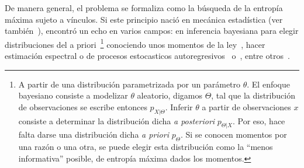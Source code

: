De manera general, el problema se  formaliza como la b\'usqueda de la entrop\'ia
m\'axima  sujeto  a  v\'inculos.    Si  este  principio  naci\'o  en  mec\'anica
estad\'istica  (ver  tambi\'en~\cite{Jay57,   Jay57:2,  Jay65,  Mer10,  Mer18}),
encontr\'o  un  echo en  varios  campos:  en  inferencia bayesiana  para  elegir
distribuciones   del   a  priori~\footnote{A   partir   de  una   distribuci\'on
  parametrizada por  un par\'ametro $\theta$.   El enfoque bayesiano  consiste a
  modelizar $\theta$  aleatorio, digamos $\Theta$, tal que  la distribuci\'on de
  observaciones se  escribe entonces $p_{X|\Theta}$.  Inferir  $\theta$ a partir
  de  observaciones $x$  consiste a  determinar la  distribuci\'on dicha  {\it a
    posteriori} $p_{\Theta|X}$.   Por eso,  hace falta darse  una distribuci\'on
  dicha {\it a priori} $p_\Theta$.  Si se conocen momentos por una raz\'on o una
  otra,  se  puede elegir  esta  distribuci\'on  como  la ``menos  informativa''
  posible, \ie de  entrop\'ia m\'axima dados los momentos.\label{Foot:SZ:Prior}}
conociendo  unos momentos  de la  ley~\cite{Rob07, Jay68,  Jay82,  Csi91}, hacer
estimaci\'on  espectral o  de procesos  estocasticos autoregresivos~\cite{Bur67,
  Bur75,  Jay82} o~\cite[cap.~12]{CovTho06},  entre  otros~\cite[\& ref.]{Arn01,
  Kap89, KapKes92}.


